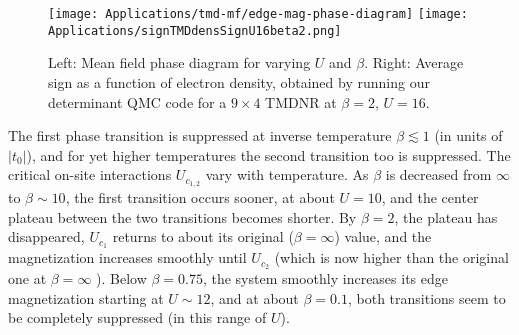 \vspace{-0.6cm}
\begin{figure}[H]
\hspace{0.3cm}
\texttt{[image: Applications/tmd-mf/edge-mag-phase-diagram]}
\texttt{[image: Applications/signTMDdensSignU16beta2.png]}
	\caption[Mean field phase diagram for varying $U$ and $\beta$. Average sign as a function of electron density, obtained by running our determinant \ac{QMC} code for a $9 \times 4$ \acs{TMDNR} at $\beta = 2$, $U = 16$.]{Left: Mean field phase diagram for varying $U$ and $\beta$. Right: Average sign as a function of electron density, obtained by running our determinant \ac{QMC} code for a $9 \times 4$ \acs{TMDNR} at $\beta = 2$, $U = 16$.}
	\label{fig:pdMF}
\end{figure}
\vspace{-0.3cm}
The first phase transition is suppressed at inverse temperature $\beta \lesssim 1$ (in units of $| t_0 |$), and for yet higher temperatures the second transition too is suppressed.
The critical on-site interactions $U_{c_{1, 2}}$ vary with temperature.
As $\beta$ is decreased from $\infty$ to $\beta \sim 10$, the first transition occurs sooner, at about $U = 10$, and the center plateau between the two transitions becomes shorter.
By $\beta = 2$, the plateau has disappeared, $U_{c_1}$ returns to about its original ($\beta = \infty$) value, and the magnetization increases smoothly until $U_{c_2}$ (which is now higher than the original one at $\beta = \infty$ ).
Below $\beta = 0.75$, the system smoothly increases its edge magnetization starting at $U \sim 12$, and at about $\beta = 0.1$, both transitions seem to be completely suppressed (in this range of $U$).

